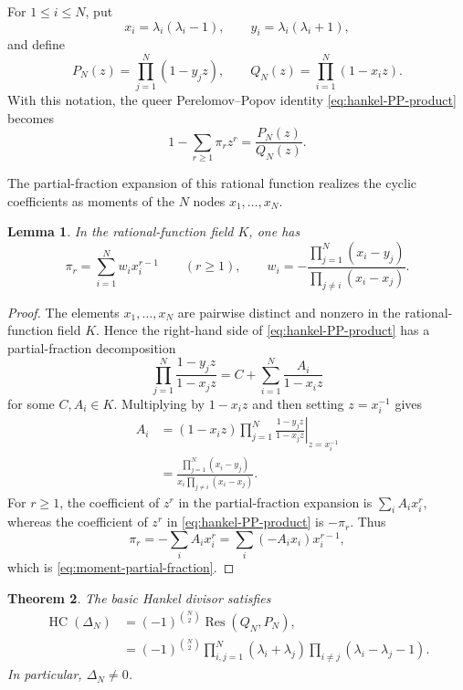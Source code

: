 \documentclass[11pt]{amsart}
\numberwithin{equation}{section}
\newtheorem{theorem}{Theorem}[section]
\newtheorem{lemma}[theorem]{Lemma}
\theoremstyle{definition}
\theoremstyle{remark}
\newcommand{\HC}{\operatorname{HC}}
\begin{document}
For \(1\leq i\leq N\), put
\begin{equation}
 x_i=\lambda_i(\lambda_i-1),
 \qquad
 y_i=\lambda_i(\lambda_i+1),
 \label{eq:xy-definition}
\end{equation}
and define
\begin{equation}
 P_N(z)=\prod_{j=1}^N(1-y_jz),
 \qquad
 Q_N(z)=\prod_{i=1}^N(1-x_iz).
 \label{eq:PQ-definition}
\end{equation}
With this notation, the queer Perelomov--Popov identity
\eqref{eq:hankel-PP-product} becomes
\begin{equation}
 1-\sum_{r\geq1}\pi_rz^r
 =\frac{P_N(z)}{Q_N(z)}.
 \label{eq:PQ-cyclic-series}
\end{equation}

The partial-fraction expansion of this rational function realizes the
cyclic coefficients as moments of the \(N\) nodes
\(x_1,\ldots,x_N\).

\begin{lemma}
\label{lem:moment}
In the rational-function field \(K\), one has
\begin{equation}
 \pi_r=\sum_{i=1}^Nw_ix_i^{r-1}
 \qquad(r\geq1),
 \qquad
 w_i=
 -\frac{\prod_{j=1}^N(x_i-y_j)}
        {\prod_{j\neq i}(x_i-x_j)}.
 \label{eq:moment-partial-fraction}
\end{equation}
\end{lemma}

\begin{proof}
The elements \(x_1,\ldots,x_N\) are pairwise distinct and nonzero in
the rational-function field \(K\).  Hence the right-hand side of
\eqref{eq:hankel-PP-product} has a partial-fraction decomposition
\[
 \prod_{j=1}^N\frac{1-y_jz}{1-x_jz}
 =C+\sum_{i=1}^N\frac{A_i}{1-x_iz}
\]
for some \(C,A_i\in K\).  Multiplying by \(1-x_iz\) and then setting
\(z=x_i^{-1}\) gives
\begin{align*}
 A_i
 &=\left.
   (1-x_iz)\prod_{j=1}^N\frac{1-y_jz}{1-x_jz}
   \right|_{z=x_i^{-1}}\\
 &=\frac{\prod_{j=1}^N(x_i-y_j)}
         {x_i\prod_{j\neq i}(x_i-x_j)}.
\end{align*}
For \(r\geq1\), the coefficient of \(z^r\) in the partial-fraction
expansion is \(\sum_iA_ix_i^r\), whereas the coefficient of \(z^r\)
in \eqref{eq:hankel-PP-product} is \(-\pi_r\). Thus
\[
 \pi_r=-\sum_iA_ix_i^r
       =\sum_i(-A_ix_i)x_i^{r-1},
\]
which is \eqref{eq:moment-partial-fraction}.
\end{proof}

\begin{theorem}
\label{thm:Delta-resultant-factorization}
The basic Hankel divisor satisfies
\begin{align}
 \HC(\Delta_N)
 &=
 (-1)^{\binom N2}
 \operatorname{Res}(Q_N,P_N),
 \label{eq:Delta-is-resultant}\\
 &=
 (-1)^{\binom N2}
 \prod_{i,j=1}^N(\lambda_i+\lambda_j)
 \prod_{i\neq j}(\lambda_i-\lambda_j-1).
 \label{eq:Delta-product}
\end{align}
In particular, \(\Delta_N\neq0\).
\end{theorem}
\end{document}
